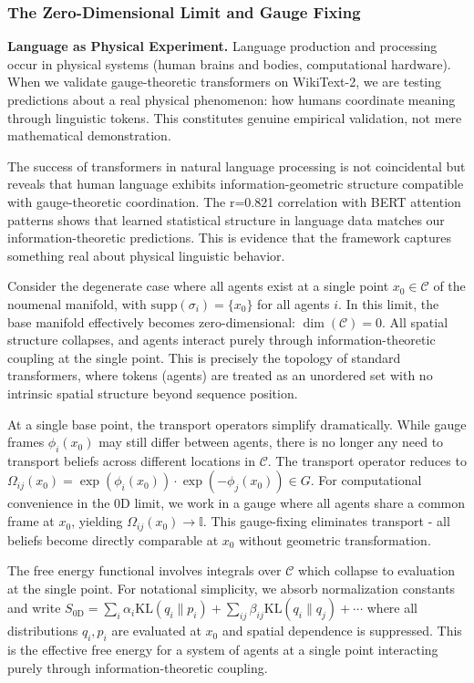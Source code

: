 \documentclass[11pt]{article}
\begin{document}
\subsubsection{The Zero-Dimensional Limit and Gauge Fixing}

\textbf{Language as Physical Experiment.} Language production and processing occur in physical systems (human brains and bodies, computational hardware). When we validate gauge-theoretic transformers on WikiText-2, we are testing predictions about a real physical phenomenon: how humans coordinate meaning through linguistic tokens. This constitutes genuine empirical validation, not mere mathematical demonstration.

The success of transformers in natural language processing is not coincidental but reveals that human language exhibits information-geometric structure compatible with gauge-theoretic coordination. The r=0.821 correlation with BERT attention patterns shows that learned statistical structure in language data matches our information-theoretic predictions. This is evidence that the framework captures something real about physical linguistic behavior.


Consider the degenerate case where all agents exist at a single point $x_0 \in \mathcal{C}$ of the noumenal manifold, with $\mathrm{supp}(\sigma_i) = \{x_0\}$ for all agents $i$. In this limit, the base manifold effectively becomes zero-dimensional: $\dim(\mathcal{C}) = 0$. All spatial structure collapses, and agents interact purely through information-theoretic coupling at the single point. This is precisely the topology of standard transformers, where tokens (agents) are treated as an unordered set with no intrinsic spatial structure beyond sequence position.

At a single base point, the transport operators simplify dramatically. While gauge frames $\phi_i(x_0)$ may still differ between agents, there is no longer any need to transport beliefs across different locations in $\mathcal{C}$. The transport operator reduces to $\Omega_{ij}(x_0) = \exp(\phi_i(x_0)) \cdot \exp(-\phi_j(x_0)) \in G$. For computational convenience in the 0D limit, we work in a gauge where all agents share a common frame at $x_0$, yielding $\Omega_{ij}(x_0) \to \mathbb{I}$. This gauge-fixing eliminates transport - all beliefs become directly comparable at $x_0$ without geometric transformation.

The free energy functional involves integrals over $\mathcal{C}$ which collapse to evaluation at the single point. For notational simplicity, we absorb normalization constants and write $S_{\mathrm{0D}} = \sum_i \alpha_i \mathrm{KL}(q_i \| p_i) + \sum_{ij} \beta_{ij} \mathrm{KL}(q_i \| q_j) + \cdots$ where all distributions $q_i, p_i$ are evaluated at $x_0$ and spatial dependence is suppressed. This is the effective free energy for a system of agents at a single point interacting purely through information-theoretic coupling.
\end{document}

